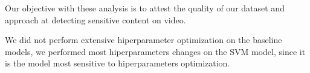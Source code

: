 

Our objective with these analysis is to attest the quality of our dataset and approach at detecting sensitive content on video.

We did not perform extensive hiperparameter optimization on the baseline models, we performed most hiperparameters changes on the SVM model, since it is the model most sensitive to hiperparameters optimization.
 
